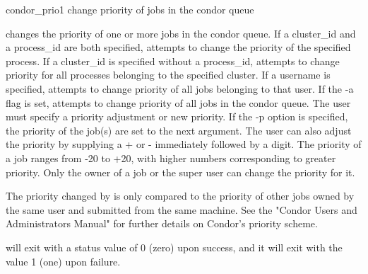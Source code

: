 \label{man-condor-prio}
\begin{ManPage}{condor\_prio}{1}
{change priority of jobs in the condor queue} 
\Synopsis {}


\Description

 changes the priority of one or more jobs in the condor
queue.
If a cluster\_id and a process\_id are both specified, 
attempts to change the priority of the specified process.
If a cluster\_id is specified without a process\_id, 
attempts to change priority for all processes belonging to the
specified cluster.
If a username is specified,  attempts to change priority
of all jobs belonging to that user.
If the -a flag is set,  attempts to change priority of
all jobs in the condor queue.
The user must specify a priority adjustment or new priority. 
If the -p option is specified, the priority of the job(s) are set to
the next argument.
The user can also adjust the priority by supplying a + or -
immediately followed by a digit.
The priority of a job ranges from -20 to +20, with higher numbers
corresponding to greater priority.
Only the owner of a job or the super user can change the priority for
it.

The priority changed by  is only compared to the priority
of other jobs owned by the same user and submitted from the same
machine.
See the "Condor Users and Administrators Manual" for further details
on Condor's priority scheme.

\begin{Options}
\end{Options}

\ExitStatus

 will exit with a status value of 0 (zero) upon success,
and it will exit with the value 1 (one) upon failure.

\end{ManPage}
